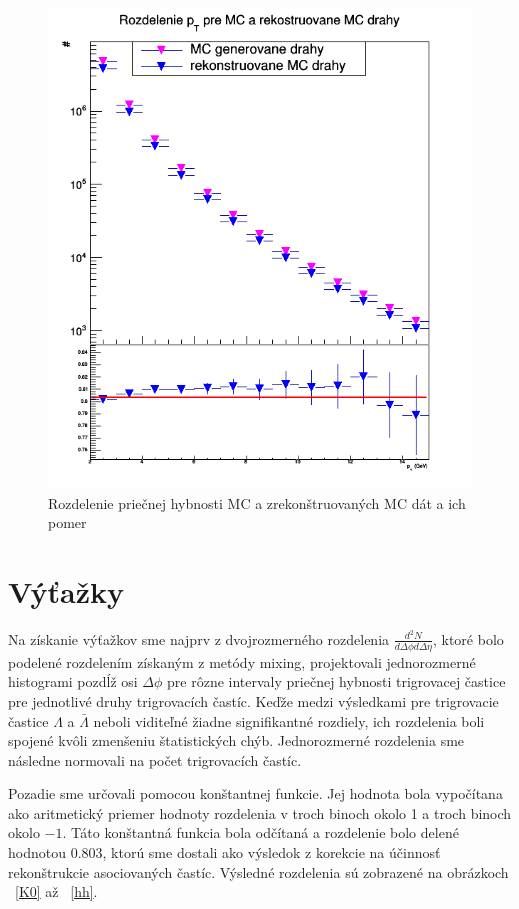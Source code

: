 \documentclass[thesismargins, thesislinespacing]{rnthesis}
\begin{document}
\begin{figure}[hbtp!]
	\centering
	\includegraphics[scale=0.35]{./Obrazky_praca/MC_closure.png}
	\caption{Rozdelenie priečnej hybnosti MC a zrekonštruovaných MC dát a ich pomer}
	\label{mc}
\end{figure}



\section{Výťažky}

Na získanie výťažkov sme najprv z dvojrozmerného rozdelenia $\frac{d^2N}{d\Delta \phi d\Delta \eta}$, ktoré bolo podelené rozdelením získaným z metódy mixing, projektovali jednorozmerné histogra\-mi pozdĺž osi $\Delta\phi$ pre rôzne intervaly priečnej hybnosti trigrovacej častice pre jednotlivé druhy trigrovacích častíc. Keďže medzi  výsledkami pre trigrovacie častice $\Lambda$ a $\bar{\Lambda}$ neboli viditeľné žiadne signifikantné rozdiely, ich rozdelenia boli spojené kvôli zmenšeniu štatistických chýb. Jednorozmerné rozdelenia sme následne normovali na počet trigrovacích častíc. 

Pozadie sme určovali pomocou konštantnej funkcie. Jej hodnota bola vypočítana ako aritmetický priemer hodnoty rozdelenia v troch binoch okolo 1 a troch binoch okolo $-1$. Táto konštantná funkcia bola odčítaná a rozdelenie bolo delené hodnotou 0.803, ktorú sme dostali ako výsledok z korekcie na účinnosť rekonštrukcie asociovaných častíc. Výsledné rozdelenia sú zobrazené na obrázkoch ~\ref{K0} až ~\ref{hh}. 
\end{document}
